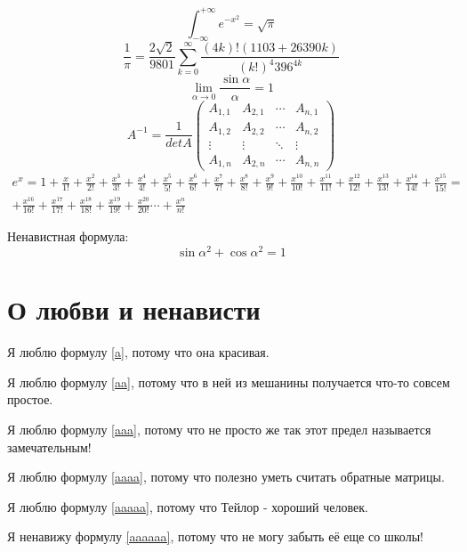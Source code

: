\documentclass[12pt, a4paper]{article}
\begin{document}
 \begin{equation} \label{a} \int_{-\infty}^{+\infty} e^{-x^{2}} = \sqrt{\pi} \end{equation}
 \begin{equation} \label{aa} \frac{1}{\pi} = \frac{2\sqrt{2}}{9801}\sum_{k=0}^{\infty} \frac{(4k)!(1103+26390k)}{(k!)^4 396^{4k}} \end{equation}
 \begin{equation} \label{aaa} \lim_{\alpha \to 0} \frac{\sin{\alpha}}{\alpha} = 1 \end{equation}
\begin{equation} \label{aaaa} A^{-1}= \frac{1}{detA} \begin{pmatrix} 
 A_{1,1} & A_{2,1} & \cdots & A_{n,1} \\
  A_{1,2} & A_{2,2} & \cdots & A_{n,2} \\
  \vdots  & \vdots  & \ddots & \vdots  \\
  A_{1,n} & A_{2,n} & \cdots & A_{n,n}
\end{pmatrix} 
\end{equation}
\begin{multline} \label{aaaaa} e^x = 1 + \frac{x}{1!} + \frac{x^2}{2!} + \frac{x^3}{3!} + \frac{x^4}{4!} + \frac{x^5}{5!} + \frac{x^6}{6!} + \frac{x^7}{7!} + \frac {x^8}{8!} + \frac{x^9}{9!} + \frac{x^{10}}{10!} + \frac{x^{11}}{11!} + \frac{x^{12}}{12!}+ \frac{x^{13}}{13!} + \frac{x^{14}}{14!}+\frac{x^{15}}{15!} = \\
+\frac{x^{16}}{16!}+\frac{x^{17}}{17!}+\frac{x^{18}}{18!}+\frac{x^{19}}{19!}+\frac{x^{20}}{20!} \cdots + \frac{x^n}{n!} \end{multline}


Ненавистная формула: 
\begin{equation} \label{aaaaaa} \sin{\alpha}^2 + \cos{\alpha}^2 =1   \end{equation}

\section{О любви и ненависти}

Я люблю формулу \eqref{a}, потому что она красивая.

Я люблю формулу \eqref{aa}, потому что в ней из мешанины получается что-то совсем простое.

Я люблю формулу \eqref{aaa}, потому что не просто же так этот предел называется замечательным!

Я люблю формулу \eqref{aaaa}, потому что полезно уметь считать обратные матрицы.
 
Я люблю формулу \eqref{aaaaa}, потому что Тейлор - хороший человек. 

Я ненавижу формулу \eqref{aaaaaa}, потому что не могу забыть её еще со школы! 
\end{document}
